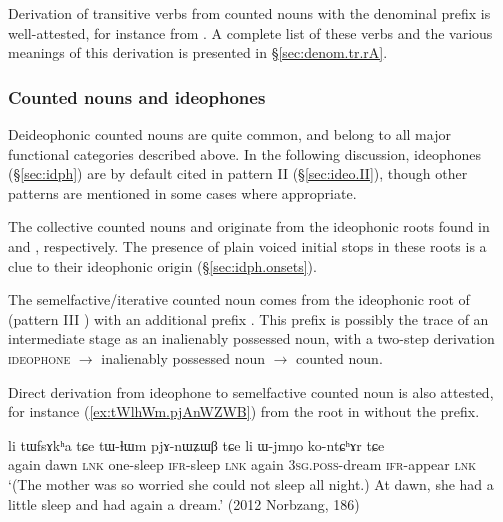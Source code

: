 Derivation of transitive verbs from counted nouns with the denominal prefix  is well-attested, for instance  from . A complete list of these verbs and the various meanings of this derivation is presented in  §\ref{sec:denom.tr.rA}.
 
\subsubsection{Counted nouns and ideophones}   \label{sec:CN.ideophones}
Deideophonic counted nouns are quite common, and belong to all major functional categories described above. In the following discussion, ideophones (§\ref{sec:idph}) are by default cited in pattern II (§\ref{sec:ideo.II}), though other patterns are mentioned in some cases where appropriate.

The collective counted nouns  and  originate from the ideophonic roots found in  and , respectively. The presence of plain voiced initial stops in these roots is a clue to their ideophonic origin (§\ref{sec:idph.onsets}).

The semelfactive/iterative counted noun  comes from the ideophonic root of  (pattern III ) with an additional prefix . This prefix is possibly the trace of an intermediate stage as an inalienably possessed noun, with a two-step derivation \textsc{ideophone} $\rightarrow$ inalienably possessed noun $\rightarrow$ counted noun.

Direct derivation from ideophone to semelfactive counted noun is also attested, for instance  (\ref{ex:tWlhWm.pjAnWZWB}) from the root in  without the  prefix.

\begin{exe}
\ex \label{ex:tWlhWm.pjAnWZWB} 
\gll li tɯfsɤkʰa tɕe tɯ-ɬɯm pjɤ-nɯʑɯβ tɕe li ɯ-jmŋo ko-ntɕʰɤr tɕe \\
again dawn \textsc{lnk} one-sleep \textsc{ifr}-sleep \textsc{lnk} again  \textsc{3sg}.\textsc{poss}-dream \textsc{ifr}-appear \textsc{lnk} \\
\glt `(The mother was so worried she could not sleep all night.) At dawn, she had a little sleep and had again a dream.' (2012 Norbzang, 186)
\end{exe}

